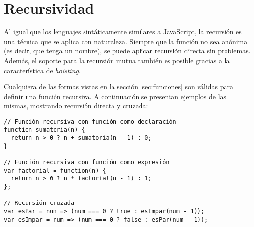 \section{Recursividad}

Al igual que los lenguajes sintáticamente similares a JavaScript, la recursión es una técnica que se aplica con naturaleza. Siempre que la función no sea anónima (es decir, que tenga un nombre), se puede aplicar recursión directa sin problemas. Además, el soporte para la recursión mutua también es posible gracias a la característica de \textit{hoisting}.

Cualquiera de las formas vistas en la sección \ref{sec:funciones} son válidas para definir una función recursiva. A continuación se presentan ejemplos de las mismas, mostrando recursión directa y cruzada:

\begin{lstlisting}[title={Ejemplos de funciones recursivas}]
// Función recursiva con función como declaración
function sumatoria(n) {
  return n > 0 ? n + sumatoria(n - 1) : 0;
}

// Función recursiva con función como expresión
var factorial = function(n) {
  return n > 0 ? n * factorial(n - 1) : 1;
};

// Recursión cruzada
var esPar = num => (num === 0 ? true : esImpar(num - 1));
var esImpar = num => (num === 0 ? false : esPar(num - 1));
\end{lstlisting}

